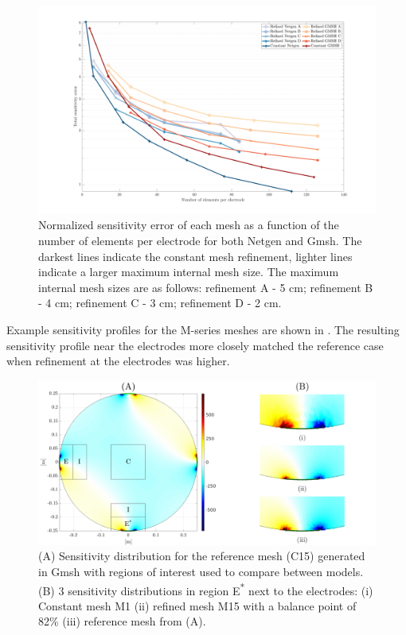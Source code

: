 \begin{figure}[H]
  \includegraphics[width=\columnwidth]{chapter4-mesh_refinement/imgs/sens_error_total.pdf}
  \caption[Mesh sensitivity error vs. elements per electrode]{\label{fig:results_sens_original} 
  Normalized sensitivity error of each mesh as a function 
  of the number of elements per electrode for both Netgen and Gmsh. The darkest lines indicate the
  constant mesh refinement, lighter lines indicate a larger maximum internal mesh size. The maximum
  internal mesh sizes are as follows: refinement A - 5 cm; refinement B - 4 cm; refinement C - 3 cm;
  refinement D - 2 cm.}
\end{figure}

Example sensitivity profiles for the M-series meshes are shown in .
The resulting sensitivity profile near the electrodes more closely matched the reference case 
when refinement at the electrodes was higher. 

\begin{figure}[H]
  \includegraphics[width=\columnwidth]{chapter4-mesh_refinement/imgs/roi_methods_figure.pdf}
  \caption[Sensitivity distribution and regions of interest]{\label{fig:roiMethods} (A) Sensitivity distribution for the reference mesh
  (C15) generated in Gmsh with regions of interest used to compare between models. 
  (B) 3 sensitivity distributions in region E\textsuperscript{*} next to the electrodes: (i) Constant mesh M1
  (ii) refined mesh M15 with a balance point of 82\% (iii) reference mesh from (A).
  }
\end{figure}

